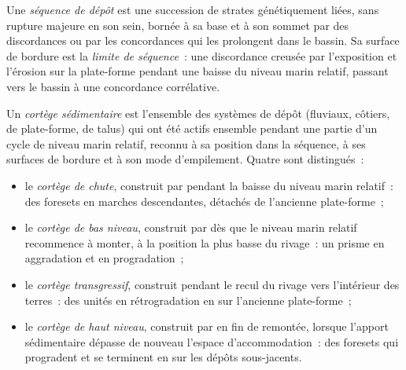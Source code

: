 \begin{definition}\label{def:b3:sequence-stratigraphy:sequence}
Une \emph{séquence de dépôt} est une succession
de strates génétiquement liées, sans rupture majeure en son sein, bornée à sa base
et à son sommet par des discordances ou par les concordances qui les prolongent dans le
bassin. Sa surface de bordure est la \emph{limite de
séquence}~: une discordance creusée par l'exposition et l'érosion sur la
plate-forme pendant une baisse du niveau marin relatif, passant vers le bassin à une
concordance corrélative.
\end{definition}

\begin{definition}\label{def:b3:sequence-stratigraphy:tract}
Un \emph{cortège sédimentaire} est l'ensemble des systèmes de dépôt
(fluviaux, côtiers, de plate-forme, de talus) qui ont été actifs ensemble pendant une
partie d'un cycle de niveau marin relatif, reconnu à sa position dans la
séquence, à ses surfaces de bordure et à son mode d'empilement. Quatre sont
distingués~:
\begin{itemize}
\item le \emph{cortège de chute},
  construit par  pendant la baisse du niveau marin relatif~:
  des foresets en marches descendantes, détachés de l'ancienne plate-forme~;
\item le \emph{cortège de bas niveau},
  construit par  dès que le niveau marin relatif recommence à monter,
  à la position la plus basse du rivage~: un prisme en aggradation et en progradation~;
\item le \emph{cortège transgressif},
  construit pendant le recul du rivage vers l'intérieur des terres~: des unités en rétrogradation
  en  sur l'ancienne plate-forme~;
\item le \emph{cortège de haut niveau},
  construit par  en fin de remontée, lorsque l'apport sédimentaire dépasse de nouveau
  l'espace d'accommodation~: des foresets qui progradent et se terminent en  sur les dépôts sous-jacents.
\end{itemize}
\end{definition}

